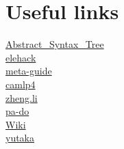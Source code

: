 
\section{Useful links}
  \href{http://brion.inria.fr/gallium/index.php/Abstract\_Syntax\_Tree}{Abstract\_Syntax\_Tree} \\
  \href{http://elehack.net/michael/blog/2010/06/ocaml-syntax-extension}{elehack} \\
  \href{http://andreiformiga.com/blog/?p=99}{meta-guide} \\
  \href{http://www.wisdomandwonder.com/link/5302/resources-for-learning-camlp4}{camlp4} \\
  \href{http://www.pps.jussieu.fr/~li/software/}{zheng.li}\\
  \href{http://alaska-kamtchatka.blogspot.com/2010/08/what-can-pado-for-you.html}{pa-do}\\

  \href{http://brion.inria.fr/gallium/index.php/Category:Camlp4}{Wiki}\\

  \href{http://www.oiwa.jp/~yutaka/caml/index-en.html}{yutaka}\\
  
